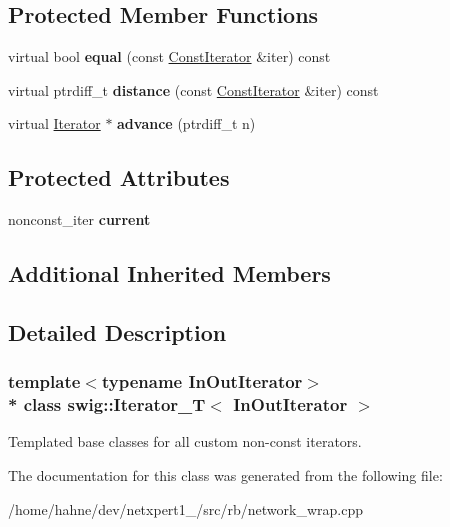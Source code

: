 \subsection*{Protected Member Functions}
\begin{DoxyCompactItemize}
\item 
virtual bool {\bfseries equal} (const \hyperlink{structswig_1_1ConstIterator}{Const\+Iterator} \&iter) const \hypertarget{classswig_1_1Iterator__T_ac3311dda5004c50dcd63ff2bd3327dc1}{}\label{classswig_1_1Iterator__T_ac3311dda5004c50dcd63ff2bd3327dc1}

\item 
virtual ptrdiff\+\_\+t {\bfseries distance} (const \hyperlink{structswig_1_1ConstIterator}{Const\+Iterator} \&iter) const \hypertarget{classswig_1_1Iterator__T_ae350ed5ac7a7fd3b916ea927e3114d8c}{}\label{classswig_1_1Iterator__T_ae350ed5ac7a7fd3b916ea927e3114d8c}

\item 
virtual \hyperlink{structswig_1_1Iterator}{Iterator} $\ast$ {\bfseries advance} (ptrdiff\+\_\+t n)\hypertarget{classswig_1_1Iterator__T_a045e8f75dad63a1ca87055b9aab47f5f}{}\label{classswig_1_1Iterator__T_a045e8f75dad63a1ca87055b9aab47f5f}

\end{DoxyCompactItemize}
\subsection*{Protected Attributes}
\begin{DoxyCompactItemize}
\item 
nonconst\+\_\+iter {\bfseries current}\hypertarget{classswig_1_1Iterator__T_a2a1e3c7240972052cdb84f28dbac2cd6}{}\label{classswig_1_1Iterator__T_a2a1e3c7240972052cdb84f28dbac2cd6}

\end{DoxyCompactItemize}
\subsection*{Additional Inherited Members}


\subsection{Detailed Description}
\subsubsection*{template$<$typename In\+Out\+Iterator$>$\\*
class swig\+::\+Iterator\+\_\+\+T$<$ In\+Out\+Iterator $>$}

Templated base classes for all custom non-\/const iterators. 

The documentation for this class was generated from the following file\+:\begin{DoxyCompactItemize}
\item 
/home/hahne/dev/netxpert1\+\_/src/rb/network\+\_\+wrap.\+cpp\end{DoxyCompactItemize}
